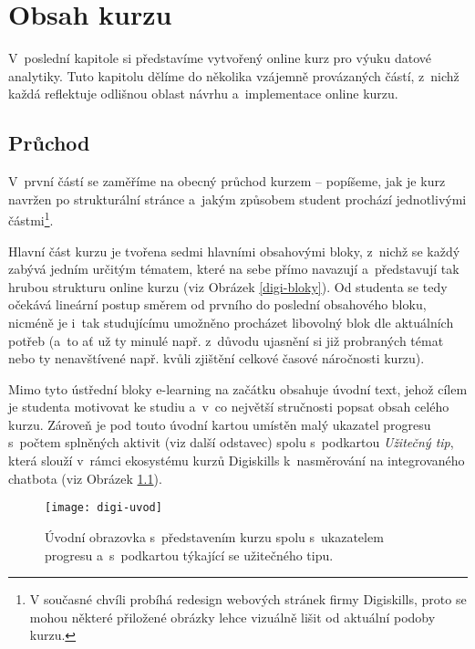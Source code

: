 \hypertarget{obsah-kurzu}{%
\chapter{Obsah kurzu}\label{obsah-kurzu}}

V~poslední kapitole si představíme vytvořený online kurz pro výuku datové analytiky. Tuto kapitolu dělíme do několika vzájemně provázaných částí, z~nichž každá reflektuje odlišnou oblast návrhu a~implementace online kurzu.

\hypertarget{prux16fchod}{%
\section{Průchod}\label{prux16fchod}}

V~první částí se zaměříme na obecný průchod kurzem -- popíšeme, jak je kurz navržen po strukturální stránce a~jakým způsobem student prochází jednotlivými částmi\footnote{V současné chvíli probíhá redesign webových stránek firmy Digiskills, proto se mohou některé přiložené obrázky lehce vizuálně lišit od aktuální podoby kurzu.}.

Hlavní část kurzu je tvořena sedmi hlavními obsahovými bloky, z~nichž se každý zabývá jedním určitým tématem, které na sebe přímo navazují a~představují tak hrubou strukturu online kurzu (viz Obrázek \ref{digi-bloky}). Od studenta se tedy očekává lineární postup směrem od prvního do poslední obsahového bloku, nicméně je i~tak studujícímu umožněno procházet libovolný blok dle aktuálních potřeb (a~to ať už ty minulé např. z~důvodu ujasnění si již probraných témat nebo ty nenavštívené např. kvůli zjištění celkové časové náročnosti kurzu).

Mimo tyto ústřední bloky e-learning na začátku obsahuje úvodní text, jehož cílem je studenta motivovat ke studiu a~v~co největší stručnosti popsat obsah celého kurzu. Zároveň je pod touto úvodní kartou umístěn malý ukazatel progresu s~počtem splněných aktivit (viz další odstavec) spolu s~podkartou \emph{Užitečný tip}, která slouží v~rámci ekosystému kurzů Digiskills k~nasměrování na integrovaného chatbota (viz Obrázek \ref{digi-uvod}).

\begin{figure}[h]   
    \centering
    \texttt{[image: digi-uvod]}  
    \caption{Úvodní obrazovka s~představením kurzu spolu s~ukazatelem progresu a~s~podkartou týkající se užitečného tipu.}
    \label{digi-uvod}
\end{figure}


